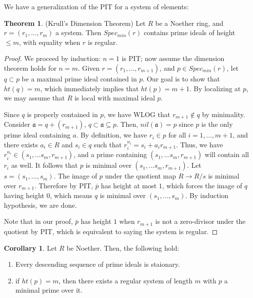 \documentclass{article}
\theoremstyle{definition}
\newtheorem{theorem}{Theorem}[section]
\theoremstyle{definition}
\theoremstyle{definition}
\theoremstyle{definition}
\theoremstyle{definition}
\theoremstyle{definition}
\newtheorem{corollary}{Corollary}[theorem]
\theoremstyle{definition}
\begin{document}
We have a generalization of the PIT for a system of elements:
\begin{tcolorbox}[colback=red!5!white,colframe=red!30!white]
\begin{theorem}
(Krull's Dimension Theorem) Let $R$ be a Noether ring, and $r=(r_1,...,r_m)$ a system. Then $Spec_{min}(r)$ contains prime ideals of height $\leq m$, with equality when $r$ is regular.
\end{theorem}
\end{tcolorbox}
\begin{proof}


    We proceed by induction: $n=1$ is PIT; now assume the dimension theorem holds for $n=m$. Given $r=(r_1,...,r_{m+1})$, and $p\in Spec_{min}(r)$, let $q\subset p$ be a maximal prime ideal contained in $p$. Our goal is to show that $ht(q)=m$, which immediately implies that $ht(p)=m+1$. By localizing at $p$, we may assume that $R$ is local with maximal ideal $p$. 

    Since $q$ is properly contained in $p$, we have WLOG that $r_{m+1}\not\in q$ by minimality.  Consider $\mathfrak{a}=q+(r_{m+1})$, $q\subset \mathfrak{a}\subseteq p$. Then, $nil(\mathfrak{a})=p$ since $p$ is the only prime ideal containing $a$. By definition, we have $r_i\in p$ for all $i=1,...,m+1$, and there exists $a_i\in R$ and $s_i\in q$ such that $r_i^{n_i}=s_i+a_ir_{m+1}$. Thus, we have $r_i^{n_i}\in (s_1,...s_m,r_{m+1})$, and a prime containing $(s_1,...s_m,r_{m+1})$ will contain all $r_i$ as well. It follows that $p$ is minimal over $(s_1,...s_m,r_{m+1})$. Let $s=(s_1,...,s_m)$. The image of $p$ under the quotient map $R\to R/s$ is minimal over $r_{m+1}$. Therefore by PIT, $\overline{p}$ has height at most $1$, which forces the image of $q$ having height $0$, which means $q$ is minimal over $(s_1,...,s_m)$. By induction hypothesis, we are done. 
    
    Note that in our proof, $\overline{p}$ has height $1$ when $r_{m+1}$ is not a zero-divisor under the quotient by PIT, which is equivalent to saying the system is regular. 
    
\end{proof}


\begin{tcolorbox}[colback=green!5!white,colframe=green!30!white]
\begin{corollary}
Let $R$ be Noether. Then, the following hold:
\begin{enumerate}
    \item Every descending sequence of prime ideals is staionary. 
    \item if $ht(p)=m$, then there exists a regular system of length $m$ with $p$ a minimal prime over it.
\end{enumerate}
\end{corollary}
\end{tcolorbox}
\end{document}
